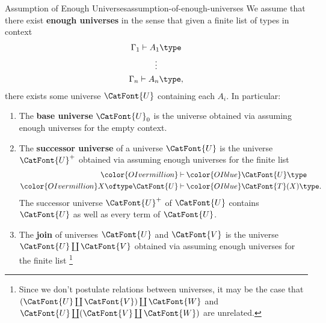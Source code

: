 \begin{remark}{Assumption of Enough Universes}{assumption-of-enough-universes}%
    We assume that there exist \textbf{enough universes} in the sense that given a finite list of types in context
    \begin{gather*}
        \Gamma_{1}\vdash A_{1}\type\\%
        \vdots\\%
        \Gamma_{n}\vdash A_{n}\type,%
    \end{gather*}
    there exists some universe $\CatFont{U}$ containing each $A_{i}$. In particular:
    \begin{enumerate}
        \item\label{assumption-of-enough-universes-the-base-universe}The \textbf{base universe} $\CatFont{U}_{0}$ is the universe obtained via assuming enough universes for the empty context.
        \item\label{assumption-of-enough-universes-successor-universes}The \textbf{successor universe} of a universe $\CatFont{U}$ is the universe $\CatFont{U}^{+}$ obtained via assuming enough universes for the finite list
            \begin{align*}
                {\color{OIvermillion}}                    &\mathbin{\vdash} {\color{OIblue}\CatFont{U}\type}\\
                {\color{OIvermillion}X\oftype\CatFont{U}} &\mathbin{\vdash} {\color{OIblue}\CatFont{T}(X)\type}.
            \end{align*}
            The successor universe $\CatFont{U}^{+}$ of $\CatFont{U}$ contains $\CatFont{U}$ as well as every term of $\CatFont{U}$.
        \item\label{assumption-of-enough-universes-joins}The \textbf{join} of universes $\CatFont{U}$ and $\CatFont{V}$ is the universe $\CatFont{U}\coprod\CatFont{V}$ obtained via assuming enough universes for the finite list%
            \footnote{%
                Since we don't postulate relations between universes, it may be the case that $(\CatFont{U}\coprod\CatFont{V})\coprod\CatFont{W}$ and $\CatFont{U}\coprod(\CatFont{V}\coprod\CatFont{W})$ are unrelated.
}
\end{enumerate}
\end{remark}
